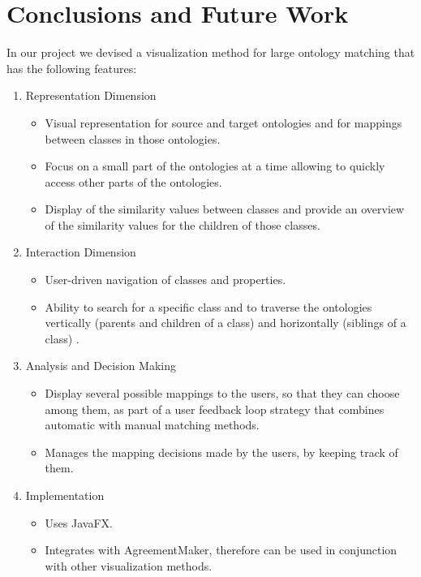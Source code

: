\chapter{Conclusions and Future Work}
In our project we devised a visualization method for large ontology
matching that has the following features:
\begin{enumerate}
	\item Representation Dimension
	\begin{itemize}
		\item Visual representation for source and
                  target ontologies and for mappings between classes
                  in those ontologies. 
		\item Focus on a small part of the ontologies at a
                  time allowing to quickly access other parts of the ontologies.
                \item Display of the similarity values between classes
                  and provide an overview of the similarity values for the
                  children of those classes.
	\end{itemize}
	\item Interaction Dimension
	\begin{itemize}
	 	\item User-driven navigation of classes and properties.
		\item Ability to search for a specific class and to
                  traverse the ontologies vertically (parents and
                  children of a class) and horizontally (siblings of a
                  class) .
	\end{itemize}
	\item Analysis and Decision Making
	\begin{itemize}
		\item Display several possible mappings to the users, so that
                  they can choose among them, as part of a user
                  feedback loop strategy that combines automatic with
                  manual matching methods. 
		\item Manages the mapping decisions made by the users,
                  by keeping track of them.
	\end{itemize}
        \item Implementation
	\begin{itemize}
        \item Uses JavaFX.
       \item Integrates with AgreementMaker, therefore can be used in
         conjunction with other visualization methods.
       \end{itemize}
\end{enumerate}

